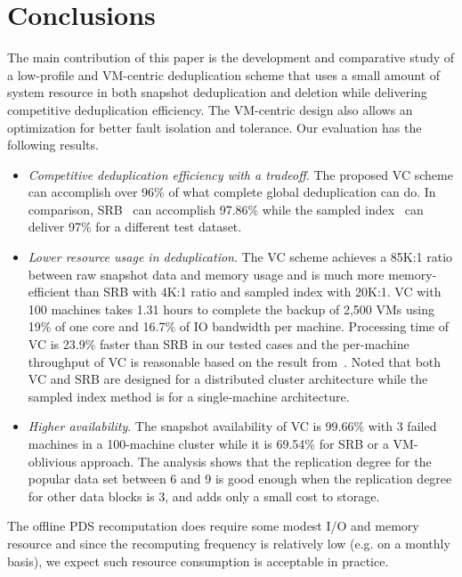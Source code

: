 \section{Conclusions}
\label{sect:conclusion}
The main contribution of this paper is the development and comparative study of a low-profile and VM-centric deduplication scheme that
uses  a small amount of system resource in both snapshot deduplication and deletion
while delivering competitive deduplication efficiency.
The VM-centric design also allows an optimization for  better fault isolation and tolerance.
Our evaluation has the following results.
\begin{itemize}
\item {\em Competitive deduplication efficiency with a tradeoff}. 
The proposed VC scheme 
can accomplish over  96\% of what complete global
deduplication can do. In comparison, SRB~\cite{Dong2011,extreme_binning09}
can accomplish 97.86\% while 
the sampled index~\cite{Guo2011} can deliver 97\% for a different test dataset. 
\item {\em Lower resource usage in deduplication}. 
The VC scheme achieves a 85K:1 ratio between raw snapshot data and memory usage
and is much more memory-efficient than 
SRB  with 4K:1 ratio and sampled index with 20K:1.
VC with 100 machines takes 1.31 hours to complete the backup of 2,500 VMs
using 19\% of one core and 16.7\% of IO bandwidth per machine. 
Processing time of VC is 23.9\% faster  than SRB in our tested cases
and the per-machine throughput of VC is reasonable based on the result 
from~\cite{Guo2011}. 
Noted that both VC and SRB are designed for a distributed cluster architecture while
the sampled index method is for a single-machine architecture.
\item {\em Higher availability}. 
The snapshot availability of VC is 99.66\% with 3 failed machines in a 100-machine cluster
while it is 69.54\% for  SRB or a VM-oblivious approach.
The analysis shows that the replication degree
for the popular data set between 6 and 9 is good enough when the replication degree
for other data blocks is 3, and adds only a small cost to storage.
\end{itemize}
The offline PDS recomputation does require some modest I/O and memory resource and 
since the recomputing frequency is relatively low (e.g. on a monthly basis), we expect such resource
consumption is acceptable in practice.

